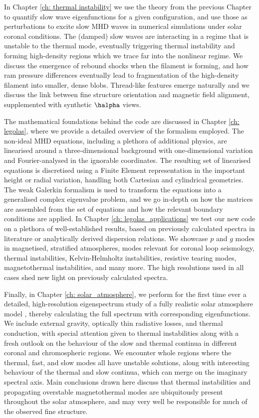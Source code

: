 In Chapter \ref{ch: thermal instability} we use the theory from the previous Chapter to quantify slow wave eigenfunctions for a given configuration, and use those as perturbations to excite slow MHD waves in numerical simulations under solar coronal conditions. The (damped) slow waves are interacting in a regime that is unstable to the thermal mode, eventually triggering thermal instability and forming high-density regions which we trace far into the nonlinear regime. We discuss the emergence of rebound shocks when the filament is forming, and how ram pressure differences eventually lead to fragmentation of the high-density filament into smaller, dense blobs. Thread-like features emerge naturally and we discuss the link between fine structure orientation and magnetic field alignment, supplemented with synthetic {$\halpha$} views.

The mathematical foundations behind the {\legolas} code are discussed in Chapter \ref{ch: legolas}, where we provide a detailed overview of the formalism employed. The non-ideal MHD equations, including a plethora of additional physics, are linearised around a three-dimensional background with one-dimensional variation and Fourier-analysed in the ignorable coordinates. The resulting set of linearised equations is discretised using a Finite Element representation in the important height or radial variation, handling both Cartesian and cylindrical geometries. The weak Galerkin formalism is used to transform the equations into a generalised complex eigenvalue problem, and we go in-depth on how the matrices are assembled from the set of equations and how the relevant boundary conditions are applied. In Chapter \ref{ch: legolas_applications} we test our new code on a plethora of well-established results, based on previously calculated spectra in literature or analytically derived dispersion relations. We showcase $p$ and $g$ modes in magnetised, stratified atmospheres, modes relevant for coronal loop seismology, thermal instabilities, Kelvin-Helmholtz instabilities, resistive tearing modes, magnetothermal instabilities, and many more. The high resolutions used in all cases shed new light on previously calculated spectra.

Finally, in Chapter \ref{ch: solar_atmosphere}, we perform for the first time ever a detailed, high-resolution eigenspectrum study of a fully realistic solar atmosphere model {\legolas}, thereby calculating the full spectrum with corresponding eigenfunctions. We include external gravity, optically thin radiative losses, and thermal conduction, with special attention given to thermal instabilities along with a fresh outlook on the behaviour of the slow and thermal continua in different coronal and chromospheric regions. We encounter whole regions where the thermal, fast, and slow modes all have unstable solutions, along with interesting behaviour of the thermal and slow continua, which can merge on the imaginary spectral axis. Main conclusions drawn here discuss that thermal instabilities and propagating overstable magnetothermal modes are ubiquitously present throughout the solar atmosphere, and may very well be responsible for much of the observed fine structure.

